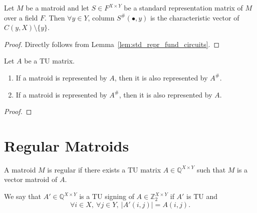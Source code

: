 \begin{lemma}
    \label{lem:std_repr_support_matrix_cols}
    \leanok
    Let $M$ be a matroid and let $S \in F^{X \times Y}$ be a standard representation matrix of $M$ over a field $F$. Then $\forall y \in Y$, column $S^{\#} (\bullet, y)$ is the characteristic vector of $C (y, X) \setminus \{y\}$.
\end{lemma}

\begin{proof}
    \leanok
    Directly follows from Lemma~\ref{lem:std_repr_fund_circuits}.
\end{proof}

\begin{lemma}
    \label{lem:repr_TU_iff_repr_TU_support}
    \leanok
    Let $A$ be a TU matrix.
    \begin{enumerate}
        \item If a matroid is represented by $A$, then it is also represented by $A^{\#}$.
        \item If a matroid is represented by $A^{\#}$, then it is also represented by $A$.
    \end{enumerate}
\end{lemma}

\begin{proof}
    \leanok
    \SeeLean
\end{proof}


\section{Regular Matroids}

\begin{definition}
    \label{def:regular}
    \leanok
    A matroid $M$ is regular if there exists a TU matrix $A \in \mathbb{Q}^{X \times Y}$ such that $M$ is a vector matroid of $A$.
\end{definition}

\begin{definition}
    \label{def:tu_signing}
    \leanok
    We say that $A' \in \mathbb{Q}^{X \times Y}$ is a TU signing of $A \in \mathbb{Z}_{2}^{X \times Y}$ if $A'$ is TU and
    \[
        \forall i \in X, \ \forall j \in Y, \ |A' (i, j)| = A (i, j).
    \]
\end{definition}

